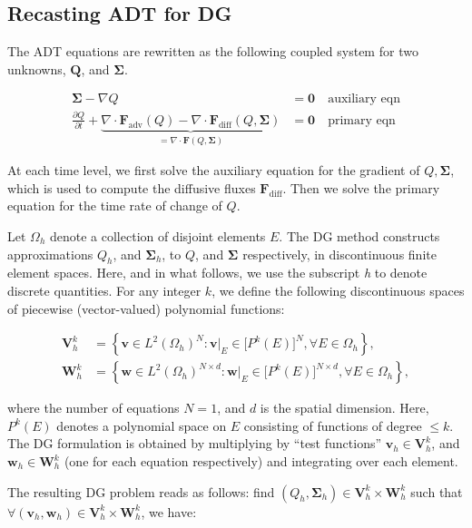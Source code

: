 \documentclass[11pt]{article}
\renewcommand{\vec}[1]{\bm{#1}}
\begin{document}
\subsection{Recasting ADT for DG}

The ADT equations are rewritten as the following coupled system for two unknowns,
$\mathbf{Q}$, and $\mathbf{\Sigma}$.

\begin{align}
\mathbf{\Sigma} - \nabla{Q} &= \mathbf{0}\quad{\text{auxiliary eqn}}\\
\frac{\partial Q}{\partial t} + \underbrace{\nabla\cdot\mathbf{F}_\text{adv}(Q) -
\nabla\cdot\mathbf{F}_\text{diff}(Q,\mathbf{\Sigma})}_{= \nabla\cdot\mathbf{F}(Q,
\mathbf{\Sigma})} &= \mathbf{0} \quad{\text{primary eqn}}
\end{align}

At each time level, we first solve the auxiliary equation for the gradient of $Q, \vec{\Sigma}$, which is used to compute the diffusive fluxes $\vec{F}_\text{diff}$.  Then we solve the primary equation for the time rate of change of $Q$.

Let $\Omega_h$ denote a collection of disjoint elements $E$. The DG method constructs approximations $Q_h$, and $\mathbf{\Sigma}_h$, to $Q$, and $\mathbf{\Sigma}$ respectively, in discontinuous finite element spaces. Here, and in what follows, we use the subscript \textit{h} to denote discrete quantities. For any integer $k$, we define the following discontinuous spaces of piecewise (vector-valued) polynomial functions:

\begin{align}
\mathbf{V}^k_h &= \left\lbrace \mathbf{v} \in L^2(\Omega_h)^N:
\mathbf{v}|_E \in \lbrack P^k(E) \rbrack^N, \forall E \in \Omega_h
\right\rbrace, \\
\mathbf{W}^k_h &= \left\lbrace \mathbf{w} \in L^2(\Omega_h)^{N\times d}:
\mathbf{w}|_E \in \lbrack P^k(E) \rbrack^{N\times d}, \forall E \in \Omega_h
\right\rbrace,
\end{align}

where the number of equations $N = 1$, and $d$ is the spatial dimension. Here, $P^k(E)$ denotes a polynomial space on $E$ consisting of functions of degree $\leq k$. The DG formulation is obtained by multiplying by ``test functions'' $\mathbf{v}_h \in \mathbf{V}^k_h$, and $\mathbf{w}_h \in \mathbf{W}^k_h$ (one for each equation respectively) and integrating over each element. 

The resulting DG problem reads as follows: find $(Q_h,\mathbf{\Sigma}_h) \in \mathbf{V}^k_h \times \mathbf{W}^k_h$ such that $\forall(\mathbf{v}_h, \mathbf{w}_h) \in \mathbf{V}^k_h \times \mathbf{W}^k_h$, we have:
\end{document}

